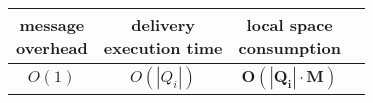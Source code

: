 


\begin{tabularx}{0.90\columnwidth}{@{}cccc@{}}
  \makecell{message\\overhead} &  \makecell{delivery\\execution time} & \makecell{local space\\consumption} & \makecell{\color{fg!30}{\# control messages}\\\color{fg!30}{per added link}} \\ \hline
  $O(1)$ & $O(|Q_i|)$ & $\mathbf{O(|Q_i|\cdot M)}$ & \color{fg!30}{$\mathbf{6}$ to $\mathbf{4\cdot |P|^2}$} \\
\end{tabularx}


